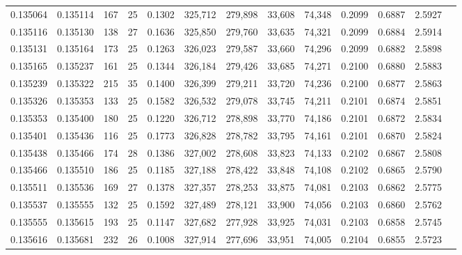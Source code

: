 \begin{tabular}{rrrrrrrrrrrrr}
0.135064 & 0.135114 & 167 &  25 &                                     0.1302 & 325,712 & 279,898 &  33,608 &  74,348 & 0.2099 & 0.6887 & 2.5927 \\
0.135116 & 0.135130 & 138 &  27 &                                     0.1636 & 325,850 & 279,760 &  33,635 &  74,321 & 0.2099 & 0.6884 & 2.5914 \\
0.135131 & 0.135164 & 173 &  25 &                                     0.1263 & 326,023 & 279,587 &  33,660 &  74,296 & 0.2099 & 0.6882 & 2.5898 \\
0.135165 & 0.135237 & 161 &  25 &                                     0.1344 & 326,184 & 279,426 &  33,685 &  74,271 & 0.2100 & 0.6880 & 2.5883 \\
0.135239 & 0.135322 & 215 &  35 &                                     0.1400 & 326,399 & 279,211 &  33,720 &  74,236 & 0.2100 & 0.6877 & 2.5863 \\
0.135326 & 0.135353 & 133 &  25 &                                     0.1582 & 326,532 & 279,078 &  33,745 &  74,211 & 0.2101 & 0.6874 & 2.5851 \\
0.135353 & 0.135400 & 180 &  25 &                                     0.1220 & 326,712 & 278,898 &  33,770 &  74,186 & 0.2101 & 0.6872 & 2.5834 \\
0.135401 & 0.135436 & 116 &  25 &                                     0.1773 & 326,828 & 278,782 &  33,795 &  74,161 & 0.2101 & 0.6870 & 2.5824 \\
0.135438 & 0.135466 & 174 &  28 &                                     0.1386 & 327,002 & 278,608 &  33,823 &  74,133 & 0.2102 & 0.6867 & 2.5808 \\
0.135466 & 0.135510 & 186 &  25 &                                     0.1185 & 327,188 & 278,422 &  33,848 &  74,108 & 0.2102 & 0.6865 & 2.5790 \\
0.135511 & 0.135536 & 169 &  27 &                                     0.1378 & 327,357 & 278,253 &  33,875 &  74,081 & 0.2103 & 0.6862 & 2.5775 \\
0.135537 & 0.135555 & 132 &  25 &                                     0.1592 & 327,489 & 278,121 &  33,900 &  74,056 & 0.2103 & 0.6860 & 2.5762 \\
0.135555 & 0.135615 & 193 &  25 &                                     0.1147 & 327,682 & 277,928 &  33,925 &  74,031 & 0.2103 & 0.6858 & 2.5745 \\
0.135616 & 0.135681 & 232 &  26 &                                     0.1008 & 327,914 & 277,696 &  33,951 &  74,005 & 0.2104 & 0.6855 & 2.5723 \\

\end{tabular}
